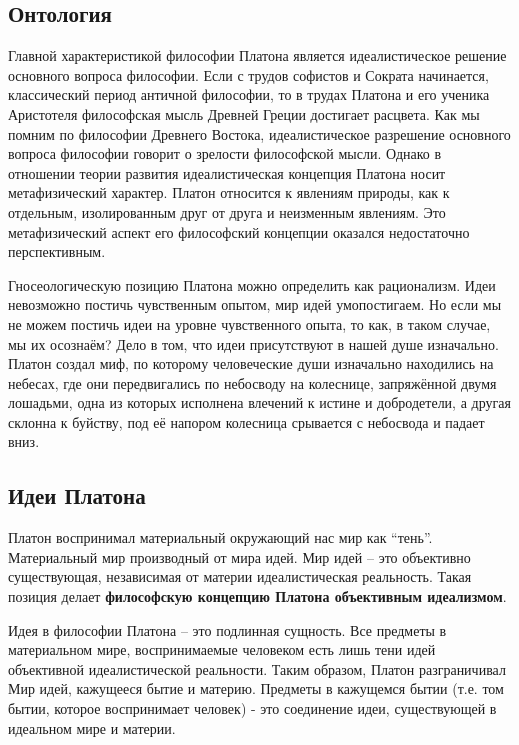 \documentclass[
]{article}
\begin{document}
\hypertarget{ux43eux43dux442ux43eux43bux43eux433ux438ux44f}{%
\subsection{Онтология}\label{ux43eux43dux442ux43eux43bux43eux433ux438ux44f}}

Главной характеристикой философии Платона является идеалистическое
решение основного вопроса философии. Если с трудов софистов и Сократа
начинается, классический период античной философии, то в трудах Платона
и его ученика Аристотеля философская мысль Древней Греции достигает
расцвета. Как мы помним по философии Древнего Востока, идеалистическое
разрешение основного вопроса философии говорит о зрелости философской
мысли. Однако в отношении теории развития идеалистическая концепция
Платона носит метафизический характер. Платон относится к явлениям
природы, как к отдельным, изолированным друг от друга и неизменным
явлениям. Это метафизический аспект его философский концепции оказался
недостаточно перспективным.

Гносеологическую позицию Платона можно определить как рационализм. Идеи
невозможно постичь чувственным опытом, мир идей умопостигаем. Но если мы
не можем постичь идеи на уровне чувственного опыта, то как, в таком
случае, мы их осознаём? Дело в том, что идеи присутствуют в нашей душе
изначально. Платон создал миф, по которому человеческие души изначально
находились на небесах, где они передвигались по небосводу на колеснице,
запряжённой двумя лошадьми, одна из которых исполнена влечений к истине
и добродетели, а другая склонна к буйству, под её напором колесница
срывается с небосвода и падает вниз.

\hypertarget{ux438ux434ux435ux438-ux43fux43bux430ux442ux43eux43dux430}{%
\subsection{Идеи
Платона}\label{ux438ux434ux435ux438-ux43fux43bux430ux442ux43eux43dux430}}

Платон воспринимал материальный окружающий нас мир как ``тень''.
Материальный мир производный от мира идей. Мир идей -- это объективно
существующая, независимая от материи идеалистическая реальность. Такая
позиция делает \textbf{философскую концепцию Платона объективным
идеализмом}.

Идея в философии Платона -- это подлинная сущность. Все предметы в
материальном мире, воспринимаемые человеком есть лишь тени идей
объективной идеалистической реальности. Таким образом, Платон
разграничивал Мир идей, кажущееся бытие и материю. Предметы в кажущемся
бытии (т.е. том бытии, которое воспринимает человек) - это соединение
идеи, существующей в идеальном мире и материи.
\end{document}
